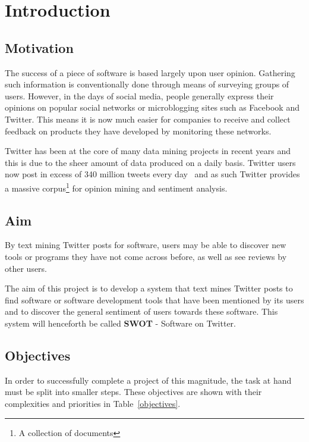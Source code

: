\chapter{Introduction}
\label{cha:intro}

\section{Motivation}
The success of a piece of software is based largely upon user opinion. Gathering such information is conventionally done through means of surveying groups of users. However, in the days of social media, people generally express their opinions on popular social networks or microblogging sites such as Facebook and Twitter. This means it is now much easier for companies to receive and collect feedback on products they have developed by monitoring these networks.

Twitter has been at the core of many data mining projects in recent years and this is due to the sheer amount of data produced on a daily basis. Twitter users now post in excess of 340 million tweets every day~\cite{twitterblog} and as such Twitter provides a massive corpus\footnote{A collection of documents} for opinion mining and sentiment analysis.

\section{Aim}
\label{sec:aim}
By text mining Twitter posts for software, users may be able to discover new tools or programs they have not come across before, as well as see reviews by other users.

The aim of this project is to develop a system that text mines Twitter posts to find software or software development tools that have been mentioned by its users and to discover the general sentiment of users towards these software. This system will henceforth be called \textbf{SWOT} - Software on Twitter.

\section{Objectives}
In order to successfully complete a project of this magnitude, the task at hand must be split into smaller steps.  These objectives are shown with their complexities and priorities in Table~\ref{objectives}.

